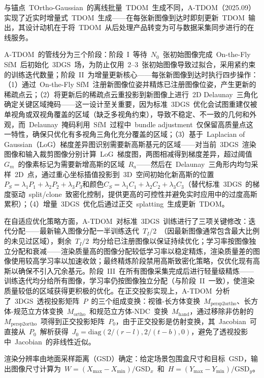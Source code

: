 与锚点~TOrtho-Gaussian~的离线批量~TDOM~生成不同，A-TDOM（2025.09）~\cite{2509_12759} 实现了近实时增量式~TDOM~生成——在每张新图像到达时即刻更新~TDOM~输出，其设计动机在于将~TDOM~从后处理产品转变为可与数据采集同步进行的在线服务。

A-TDOM~的管线分为三个阶段：阶段~I~等待~$N_0$~张初始图像完成~On-the-Fly SfM~后初始化~3DGS~场，为防止仅用~2--3~张初始图像导致过拟合，采用紧约束的训练迭代数量；阶段~II~为增量更新核心——每张新图像到达时执行四步操作：（1）通过~On-the-Fly SfM~注册新图像位姿并精炼已注册图像位姿，产生更新的稀疏点云；（2）将更新后的稀疏点云重投影到新图像上进行~2D Delaunay~三角化确定关键区域掩码——这一设计至关重要，因为标准~3DGS~优化会试图重建仅被单视角或双视角覆盖的区域（缺乏多视角约束），导致不稳定、不一致的几何和外观，而~Delaunay~掩码利用~SfM~过程中~bundle adjustment~仅保留高质量点这一特性，确保只优化有多视角三角化充分覆盖的区域；（3）基于~Laplacian of Gaussian（LoG）梯度差异图识别需要新高斯基元的区域——对当前~3DGS~渲染图像和输入裁剪图像分别计算~LoG~梯度图，两图相减得到梯度差异，超过阈值~$G_m$~的像素标记为需要新增高斯的区域~$R_a$——然后在~Delaunay~三角形内均匀采样~2D~点，通过重心坐标插值投影到~3D~空间初始化新高斯的位置$P_S = \lambda_1 P_1 + \lambda_2 P_2 + \lambda_3 P_3$和颜色$C_S = \lambda_1 C_1 + \lambda_2 C_2 + \lambda_3 C_3$（替代标准~3DGS~的梯度驱动~split/clone~致密化控制，提供更高的可控性并避免实时应用中的过度高斯累积）；（4）增量~3DGS~优化后通过正交~splatting~生成更新~TDOM。

在自适应优化策略方面，A-TDOM~对标准~3DGS~训练进行了三项关键修改：迭代分配——最新输入图像分配一半训练迭代~$T_I/2$~（因最新图像通常包含最大比例的未见过区域），剩余~$T_I/2$~均分给已注册图像以保证持续优化；学习率按图像独立分配和衰减——渲染质量高的图像分配较低学习率以稳定精炼，渲染质量差的图像使用较高学习率以加速收敛；最终精炼阶段禁用高斯致密化策略，仅优化现有高斯以确保不引入冗余基元。阶段~III~在所有图像采集完成后进行轻量级精炼——训练迭代均分给所有图像，学习率仍按图像独立分配（与阶段~II~一致），使渲染质量较低的区域获得更积极的优化。在正交投影实现上，A-TDOM~分析了~3DGS~透视投影矩阵~$P$~的三个组成变换：视锥-长方体变换~$M_{\text{persp2ortho}}$、长方体-规范立方体变换~$M_{\text{ortho}}$~和规范立方体-NDC~变换~$M_{\text{hand}}$，通过移除非仿射的~$M_{\text{persp2ortho}}$~项得到正交投影矩阵~$P_0$，由于正交投影是仿射变换，其~Jacobian~可直接从~$P_0$~解析获得~$J_0 = \text{diag}(2/(r-l), 2/(t-b), 0)$，避免了透视投影中~Jacobian~的非线性近似。

渲染分辨率由地面采样距离（GSD）确定：给定场景包围盒尺寸和目标~GSD，输出图像尺寸计算为~$W = (X_{\max} - X_{\min})/\text{GSD}_x$~和~$H = (Y_{\max} - Y_{\min})/\text{GSD}_y$。

